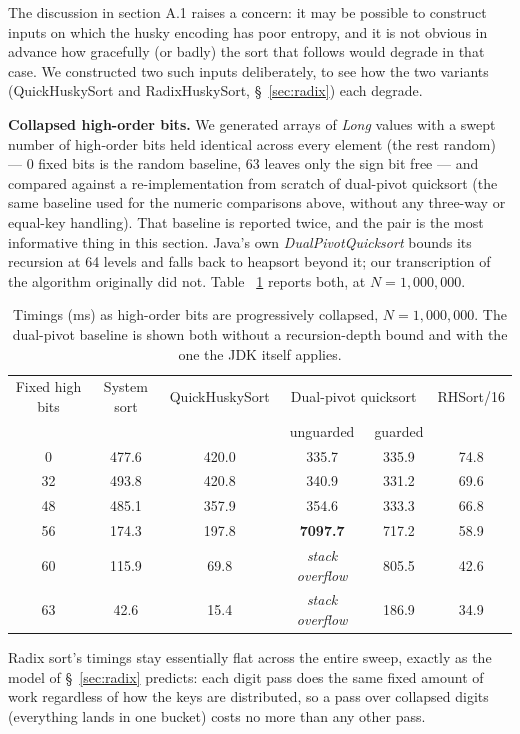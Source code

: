 \documentclass[twoside,leqno,twocolumn]{article}
\begin{document}
The discussion in section A.1 raises a concern:
it may be possible to construct inputs on which the husky encoding has poor entropy,
and it is not obvious in advance how gracefully (or badly) the sort that follows would degrade in that case.
We constructed two such inputs deliberately, to see how the two variants (QuickHuskySort and RadixHuskySort, \S~\ref{sec:radix}) each degrade.

\textbf{Collapsed high-order bits.} We generated arrays of \textit{Long} values with a swept number of high-order bits held identical across every element (the rest random) —
0 fixed bits is the random baseline, 63 leaves only the sign bit free —
and compared against a re-implementation from scratch of dual-pivot quicksort
(the same baseline used for the numeric comparisons above, without any three-way or equal-key handling).
That baseline is reported twice, and the pair is the most informative thing in this section.
Java's own \textit{DualPivotQuicksort} bounds its recursion at 64 levels and falls back to heapsort beyond it;
our transcription of the algorithm originally did not.
Table ~\ref{tab:AdversarialBits} reports both, at $N = 1{,}000{,}000$.

\begin{table}
  \caption{Timings (ms) as high-order bits are progressively collapsed, $N = 1{,}000{,}000$.
    The dual-pivot baseline is shown both without a recursion-depth bound and with the one the JDK
    itself applies.}
  \label{tab:AdversarialBits}
  \begin{tabular}{cccccc}
    \toprule
    Fixed high bits & System sort & QuickHuskySort & \multicolumn{2}{c}{Dual-pivot quicksort} & RHSort/16 \\
     & & & unguarded & guarded & \\
    \midrule
    0  & 477.6 & 420.0 & 335.7 & 335.9 & 74.8 \\
    32 & 493.8 & 420.8 & 340.9 & 331.2 & 69.6 \\
    48 & 485.1 & 357.9 & 354.6 & 333.3 & 66.8 \\
    56 & 174.3 & 197.8 & \textbf{7097.7} & 717.2 & 58.9 \\
    60 & 115.9 & 69.8  & \textit{stack overflow} & 805.5 & 42.6 \\
    63 & 42.6  & 15.4  & \textit{stack overflow} & 186.9 & 34.9 \\
    \bottomrule
  \end{tabular}
\end{table}

Radix sort's timings stay essentially flat across the entire sweep, exactly as the model of \S~\ref{sec:radix} predicts:
each digit pass does the same fixed amount of work regardless of how the keys are distributed,
so a pass over collapsed digits (everything lands in one bucket) costs no more than any other pass.
\end{document}
